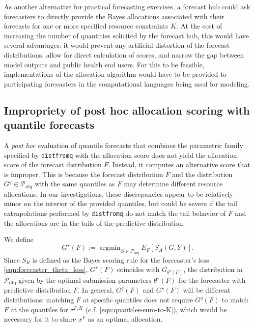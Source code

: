 \documentclass{article}
\DeclareMathOperator*{\argmin}{argmin}
\begin{document}
As another alternative for practical forecasting exercises, a forecast hub could ask forecasters to directly provide the Bayes allocations associated with their forecasts for one or more specified resource constraints $K$. At the cost of increasing the number of quantities solicited by the forecast hub, this would have several advantages: it would prevent any artificial distortion of the forecast distributions, allow for direct calculation of scores, and narrow the gap between model outputs and public health end users. For this to be feasible, implementations of the allocation algorithm would have to be provided to participating forecasters in the computational languages being used for modeling.

\subsection{Impropriety of post hoc allocation scoring with quantile forecasts}

A \emph{post hoc} evaluation of quantile forecasts that combines the parametric family specified by \verb`distfromq` with the allocation score does not yield the allocation score of the forecast distribution $F$. Instead, it computes an alternative score that is improper. This is because the forecast distribution $F$ and the distribution $G^q \in \mathcal{P}_{\text{dfq}}$ with the same quantiles as $F$ may determine different resource allocations. In our investigations, these discrepancies appear to be relatively minor on the interior of the provided quantiles, but could be severe if the tail extrapolations performed by \verb`distfromq` do not match the tail behavior of $F$ and the allocations are in the tails of the predictive distribution.

We define
$$G^{\star}(F) := \argmin_{G \in \mathcal{P}_{\mathrm{dfq}}} E_{F}[S_A(G, Y)].$$
Since $S_R$ is defined as the Bayes scoring rule for the forecaster's loss \eqref{eqn:forecaster_theta_loss}, $G^{\star}(F)$ coincides
with $G_{\theta^{\star}(F)}$, the distribution in $\mathcal{P}_{\mathrm{dfq}}$ given by the
optimal submission parameters $\theta^{\star}(F)$ for the forecaster with predictive distribution $F$.
In general, $G^q(F)$ and $G^\star(F)$ will be different distributions:  matching $F$ at specific quantiles
does not require $G^q(F)$ to match $F$ at the quantiles for $\tau^{F,K}$ (c.f. \eqref{eqn:quantiles-sum-to-K}),
which would be necessary for it to share $x^F$ as an optimal allocation.
\end{document}
